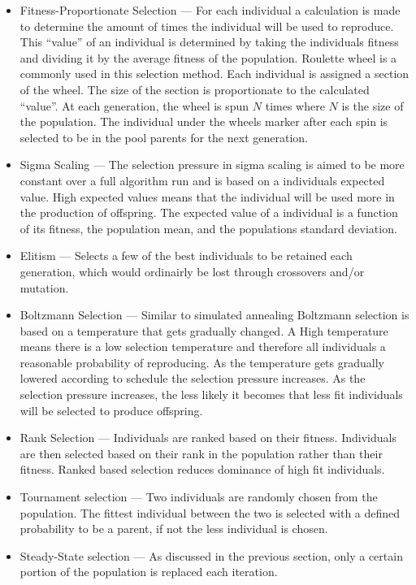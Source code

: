 \begin{itemize}
    \item{Fitness-Proportionate Selection} --- For each individual a calculation is made to determine the amount of times the individual will be used to reproduce. This ``value'' of an individual is determined by taking the individuals fitness and dividing it by the average fitness of the population. Roulette wheel is a commonly used in this selection method. Each individual is assigned a section of the wheel. The size of the section is proportionate to the calculated ``value''. At each generation, the wheel is spun $N$ times where $N$ is the size of the population. The individual under the wheels marker after each spin is selected to be in the pool parents for the next generation\cite{IntroToGAs}.
    \item{Sigma Scaling} --- The selection pressure in sigma scaling is aimed to be more constant over a full algorithm run and is based on a individuals expected value. High expected values means that the individual will be used more in the production of offspring. The expected value of a individual is a function of its fitness, the population mean, and the populations standard deviation\cite{IntroToGAs}.
    \item{Elitism} --- Selects a few of the best individuals to be retained each generation, which would ordinairly be lost through crossovers and/or mutation.
    \item{Boltzmann Selection} --- Similar to simulated annealing Boltzmann selection is based on a temperature that gets gradually changed. A High temperature means there is a low selection temperature and therefore all individuals a reasonable probability of reproducing. As the temperature gets gradually lowered according to schedule the selection pressure increases. As the selection pressure increases, the less likely it becomes that less fit individuals will be selected to produce offspring\cite{IntroToGAs}.
    \item{Rank Selection} --- Individuals are ranked based on their fitness. Individuals are then selected based on their rank in the population rather than their fitness.  Ranked based selection reduces dominance of high fit individuals\cite{IntroToGAs}.
    \item{Tournament selection} --- Two individuals are randomly chosen from the population. The fittest individual between the two is selected with a defined probability to be a parent, if not the less individual is chosen\cite{IntroToGAs}.
    \item{Steady-State selection} --- As discussed in the previous section, only a certain portion of the population is replaced each iteration.
\end{itemize}

